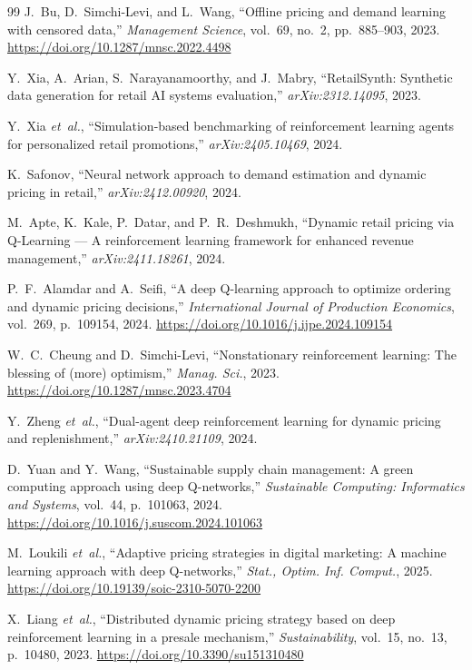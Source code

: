 \documentclass[journal, 10pt, twoside]{IEEEtran}
\begin{document}
\begin{thebibliography}{99}
J.~Bu, D.~Simchi-Levi, and L.~Wang,
``Offline pricing and demand learning with censored data,''
\textit{Management Science}, vol.~69, no.~2, pp.~885--903, 2023.
\url{https://doi.org/10.1287/mnsc.2022.4498}

Y.~Xia, A.~Arian, S.~Narayanamoorthy, and J.~Mabry,
``RetailSynth: Synthetic data generation for retail AI systems
evaluation,''
\textit{arXiv:2312.14095}, 2023.

Y.~Xia \textit{et~al.},
``Simulation-based benchmarking of reinforcement learning agents for
personalized retail promotions,''
\textit{arXiv:2405.10469}, 2024.

K.~Safonov,
``Neural network approach to demand estimation and dynamic pricing in
retail,''
\textit{arXiv:2412.00920}, 2024.

M.~Apte, K.~Kale, P.~Datar, and P.~R.~Deshmukh,
``Dynamic retail pricing via Q-Learning --- A reinforcement learning
framework for enhanced revenue management,''
\textit{arXiv:2411.18261}, 2024.

P.~F.~Alamdar and A.~Seifi,
``A deep Q-learning approach to optimize ordering and dynamic pricing
decisions,''
\textit{International Journal of Production Economics}, vol.~269,
p.~109154, 2024.
\url{https://doi.org/10.1016/j.ijpe.2024.109154}

W.~C.~Cheung and D.~Simchi-Levi,
``Nonstationary reinforcement learning: The blessing of (more) optimism,''
\textit{Manag. Sci.}, 2023.
\url{https://doi.org/10.1287/mnsc.2023.4704}

Y.~Zheng \textit{et~al.},
``Dual-agent deep reinforcement learning for dynamic pricing and
replenishment,''
\textit{arXiv:2410.21109}, 2024.

D.~Yuan and Y.~Wang,
``Sustainable supply chain management: A green computing approach using
deep Q-networks,''
\textit{Sustainable Computing: Informatics and Systems}, vol.~44,
p.~101063, 2024.
\url{https://doi.org/10.1016/j.suscom.2024.101063}

M.~Loukili \textit{et~al.},
``Adaptive pricing strategies in digital marketing: A machine learning
approach with deep Q-networks,''
\textit{Stat., Optim. Inf. Comput.}, 2025.
\url{https://doi.org/10.19139/soic-2310-5070-2200}

X.~Liang \textit{et~al.},
``Distributed dynamic pricing strategy based on deep reinforcement
learning in a presale mechanism,''
\textit{Sustainability}, vol.~15, no.~13, p.~10480, 2023.
\url{https://doi.org/10.3390/su151310480}


\end{thebibliography}
\end{document}
